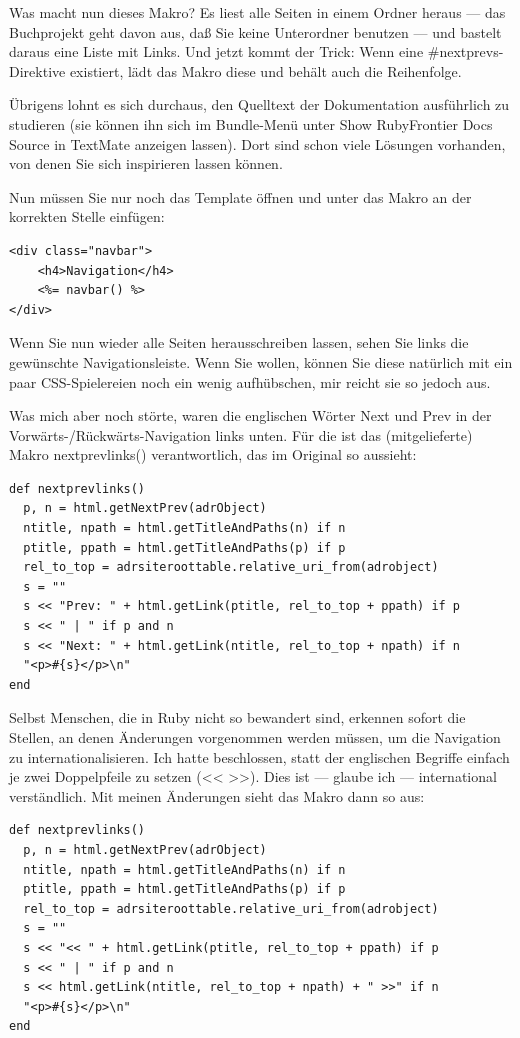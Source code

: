 \documentclass[11pt]{report}
\begin{document}
Was macht nun dieses Makro? Es liest alle Seiten in einem Ordner
heraus — das Buchprojekt geht davon aus, daß Sie keine Unterordner
benutzen — und bastelt daraus eine Liste mit Links. Und jetzt kommt
der Trick: Wenn eine \#nextprevs-Direktive existiert, lädt das Makro
diese und behält auch die Reihenfolge.


Übrigens lohnt es sich durchaus, den Quelltext der Dokumentation
ausführlich zu studieren (sie können ihn sich im Bundle-Menü unter
Show RubyFrontier Docs Source in TextMate anzeigen lassen). Dort sind
schon viele Lösungen vorhanden, von denen Sie sich inspirieren lassen
können.


Nun müssen Sie nur noch das Template öffnen und unter das Makro an der
korrekten Stelle einfügen:


\begin{verbatim}
<div class="navbar">
    <h4>Navigation</h4>
    <%= navbar() %>
</div>
\end{verbatim}

Wenn Sie nun wieder alle Seiten herausschreiben lassen, sehen Sie
links die gewünschte Navigationsleiste. Wenn Sie wollen, können Sie
diese natürlich mit ein paar CSS-Spielereien noch ein wenig
aufhübschen, mir reicht sie so jedoch aus.


Was mich aber noch störte, waren die englischen Wörter Next und Prev
in der Vorwärts-/Rückwärts-Navigation links unten. Für die ist das
(mitgelieferte) Makro nextprevlinks() verantwortlich, das im Original
so aussieht:


\begin{verbatim}
def nextprevlinks()
  p, n = html.getNextPrev(adrObject)
  ntitle, npath = html.getTitleAndPaths(n) if n
  ptitle, ppath = html.getTitleAndPaths(p) if p
  rel_to_top = adrsiteroottable.relative_uri_from(adrobject)
  s = ""
  s << "Prev: " + html.getLink(ptitle, rel_to_top + ppath) if p
  s << " | " if p and n
  s << "Next: " + html.getLink(ntitle, rel_to_top + npath) if n
  "<p>#{s}</p>\n"
end
\end{verbatim}

Selbst Menschen, die in Ruby nicht so bewandert sind, erkennen sofort
die Stellen, an denen Änderungen vorgenommen werden müssen, um die
Navigation zu internationalisieren. Ich hatte beschlossen, statt der
englischen Begriffe einfach je zwei Doppelpfeile zu setzen (<<
>>). Dies ist — glaube ich — international verständlich. Mit meinen
Änderungen sieht das Makro dann so aus:


\begin{verbatim}
def nextprevlinks()
  p, n = html.getNextPrev(adrObject)
  ntitle, npath = html.getTitleAndPaths(n) if n
  ptitle, ppath = html.getTitleAndPaths(p) if p
  rel_to_top = adrsiteroottable.relative_uri_from(adrobject)
  s = ""
  s << "<< " + html.getLink(ptitle, rel_to_top + ppath) if p
  s << " | " if p and n
  s << html.getLink(ntitle, rel_to_top + npath) + " >>" if n
  "<p>#{s}</p>\n"
end
\end{verbatim}
\end{document}
